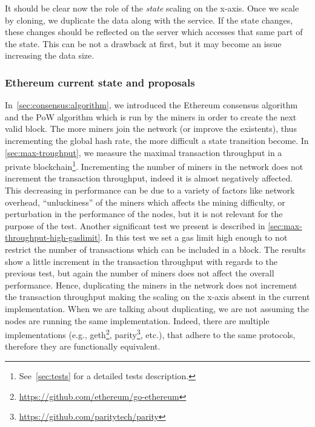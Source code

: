 It should be clear now the role of the \emph{state} scaling on the x-axis. Once
we scale by cloning, we duplicate the data along with the service. If the state
changes, these changes should be reflected on the server which accesses that
same part of the state. This can be not a drawback at first, but it may become
an issue increasing the data size.

\subsubsection{Ethereum current state and proposals}
\label{sec:x-axis-ethereum}

In~\autoref{sec:consensus:algorithm}, we introduced the Ethereum consensus
algorithm and the PoW algorithm which is run by the miners in order to create
the next valid block. The more miners join the network (or improve the
existents), thus incrementing the global hash rate, the more difficult a state
transition become. In \autoref{sec:max-troughput}, we measure the maximal
transaction throughput in a private blockchain\footnote{See~\autoref{sec:tests}
for a detailed tests description.}. Incrementing the number of miners in the
network does not increment the transaction throughput, indeed it is almost
negatively affected. This decreasing in performance can be due to a variety of
factors like network overhead, ``unluckiness'' of the miners which affects the
mining difficulty, or perturbation in the performance of the nodes, but it is
not relevant for the purpose of the test. Another significant test we present is
described in \autoref{sec:max-throughput-high-gaslimit}. In this test we set a
gas limit high enough to not restrict the number of transactions which can be
included in a block. The results show a little increment in the transaction
throughput with regards to the previous test, but again the number of miners
does not affect the overall performance. Hence, duplicating the miners in the
network does not increment the transaction throughput making the scaling on the
x-axis absent in the current implementation. When we are talking about
duplicating, we are not assuming the nodes are running the same implementation.
Indeed, there are multiple implementations (e.g.,
geth\footnote{\url{https://github.com/ethereum/go-ethereum}},
parity\footnote{\url{https://github.com/paritytech/parity}}, etc.), that adhere
to the same protocols, therefore they are functionally equivalent.


